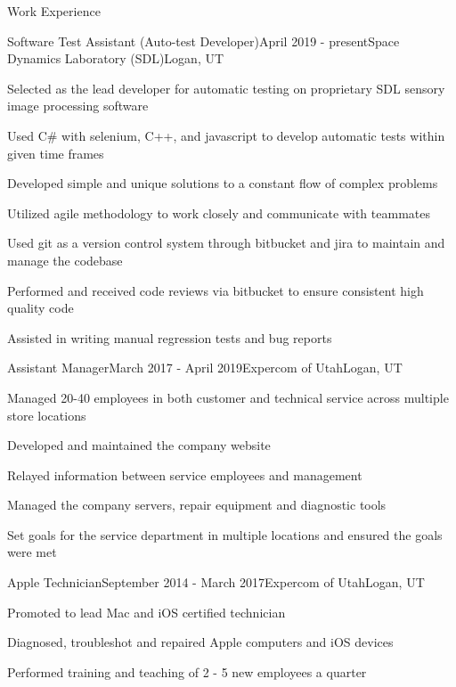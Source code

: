 \documentclass{resume}                                                      %
\begin{document}

\begin{rSection}{Work Experience}

\begin{rSubsection}{Software Test Assistant (Auto-test Developer)}{April 2019 - present}{Space Dynamics Laboratory (SDL)}{Logan, UT}
\item Selected as the lead developer for automatic testing on proprietary SDL sensory image processing software
\item Used C# with selenium, C++, and javascript to develop automatic tests within given time frames
\item Developed simple and unique solutions to a constant flow of complex problems
\item Utilized agile methodology to work closely and communicate with teammates
\item Used git as a version control system through bitbucket and jira to maintain and manage the codebase
\item Performed and received code reviews via bitbucket to ensure consistent high quality code
\item Assisted in writing manual regression tests and bug reports
\end{rSubsection}

\begin{rSubsection}{Assistant Manager}{March 2017 - April 2019}{Expercom of Utah}{Logan, UT}
\item Managed 20-40 employees in both customer and technical service across multiple store locations
\item Developed and maintained the company website
\item Relayed information between service employees and management 
\item Managed the company servers, repair equipment and diagnostic tools
\item Set goals for the service department in multiple locations and ensured the goals were met
\end{rSubsection}

\begin{rSubsection}{Apple Technician}{September 2014 - March 2017}{Expercom of Utah}{Logan, UT}
\item Promoted to lead Mac and iOS certified technician 
\item Diagnosed, troubleshot and repaired Apple computers and iOS devices
\item Performed training and teaching of 2 - 5 new employees a quarter
\end{rSubsection}

\end{rSection}
\end{document}
